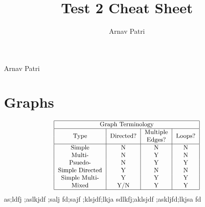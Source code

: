 \documentclass[12pt, A4, twocolumn]{article}
\title{Test 2 Cheat Sheet}
\author{Arnav Patri}
\begin{document}
	Arnav Patri
	\setcounter{section}{9}	
	\section{Graphs}
		\[\small\begin{tabular}{|c|c|c|c|}\hline
			\multicolumn{4}{|c|}{Graph Terminology} \\\hline
			\multirow{2}{*}{Type} & \multirow{2}{*}{Directed?} & Multiple & \multirow{2}{*}{Loops?} \\
			& & Edges? & \\\hline
			Simple & N & N & N \\
			Multi- & N & Y & N \\
			Psuedo- & N & Y & Y \\
			Simple Directed & Y & N & N \\
			Simple Multi- & Y & Y & Y \\
			Mixed & Y/N & Y & Y \\\hline
		\end{tabular}\]
		\normalsize
		as;ldfj ;aslkjdf ;salj fd;sajf ;klsjdf;lkja sdlkfj;aklsjdf ;askljfd;lkjsa fd
\end{document}
